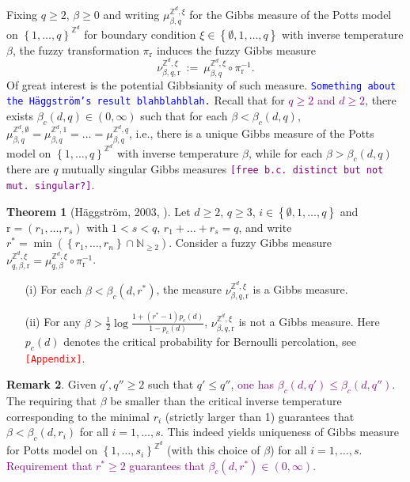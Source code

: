 \documentclass[12pt]{article}
\newcommand{\N}{\mathbb{N}}
\renewcommand{\r}{\mathrm{r}}
\newcommand{\Z}{\mathbb{Z}}
\newcommand{\set}[1]{\left\{#1\right\}}
\newcommand{\1}{\mathbbm{1}}
\newcommand{\5}{\vspace{0.5cm}}
\theoremstyle{definition}
\newtheorem{thm}{Theorem}[section]
\newtheorem{rem}[thm]{Remark}
\begin{document}
Fixing $q\geq 2$, $\beta\geq 0$ and writing $\mu_{\beta,q}^{\Z^d,\xi}$ for the Gibbs measure of the Potts model on $\set{1,\ldots,q}^{\Z^d}$ for boundary condition $\xi\in\set{\emptyset,1,\ldots,q}$ with inverse temperature $\beta$, the fuzzy transformation $\pi_\r$ induces the fuzzy Gibbs measure 
$$\nu_{\beta,q,\r}^{\Z^d,\xi} ~:=~ \mu_{\beta,q}^{\Z^d,\xi}\circ\pi_\r^{-1}.$$
Of great interest is the potential Gibbsianity of such measure. \textcolor{blue}{\texttt{Something about the H\"aggstr\"om's result blahblahblah.}} Recall that for \textcolor{purple}{$q\geq 2$ and $d\geq 2$}, there exists $\beta_c(d,q)\in(0,\infty)$ such that for each $\beta<\beta_c(d,q)$, $\mu_{\beta,q}^{\Z^d,\emptyset}=\mu_{\beta,q}^{\Z^d,1}=\ldots=\mu_{\beta,q}^{\Z^d,q}$, i.e., there is a unique Gibbs measure of the Potts model on $\set{1,\ldots,q}^{\Z^d}$ with inverse temperature $\beta$, while for each $\beta>\beta_c(d,q)$ there are $q$ mutually singular Gibbs measures \textcolor{purple}{\texttt{[free b.c.~distinct but not mut.~singular?]}}.

\begin{thm}[H\"aggstr\"om, 2003, \cite{Hag}]
Let $d\geq 2$, $q\geq 3$, $i\in\set{\emptyset,1,\ldots,q}$ and $\r=(r_1,\ldots,r_s)$ with $1<s<q$, $r_1+\ldots+r_s=q$, and write $r^*=\min(\set{r_1,\ldots,r_n}\cap\N_{\geq 2})$. Consider a fuzzy Gibbs measure $\nu_{q,\beta,\r}^{\Z^d,\xi}=\mu_{q,\beta}^{\Z^d,\xi}\circ\pi_{\r}^{-1}$.
\begin{itemize}
	\item[(i)] For each $\beta<\beta_c(d,r^*)$, the measure $\nu_{\beta,q,\r}^{\Z^d,\xi}$ is a Gibbs measure.
	\item[(ii)] For any $\beta>\frac{1}{2}\log\frac{1+(r^*-1)p_c(d)}{1-p_c(d)}$, $\nu_{\beta,q,\r}^{\Z^d,\xi}$ is not a Gibbs measure. Here $p_c(d)$ denotes the critical probability for Bernoulli percolation, see \textcolor{red}{\texttt{[Appendix]}}.
\end{itemize}
\end{thm}

\begin{rem}
Given $q',q''\geq 2$ such that $q'\leq q''$, \textcolor{purple}{one has $\beta_c(d,q')\leq\beta_c(d,q'')$}. The requiring that $\beta$ be smaller than the critical inverse temperature corresponding to the minimal $r_i$ (strictly larger than 1) guarantees that $\beta<\beta_c(d,r_i)$ for all $i=1,\ldots,s$. This indeed yields uniqueness of Gibbs measure for Potts model on $\set{1,\ldots,s_i}^{\Z^d}$ (with this choice of $\beta$) for all $i=1,\ldots,s$. \textcolor{purple}{Requirement that $r^*\geq 2$ guarantees that $\beta_c(d,r^*)\in(0,\infty)$.}
\end{rem}
\end{document}
